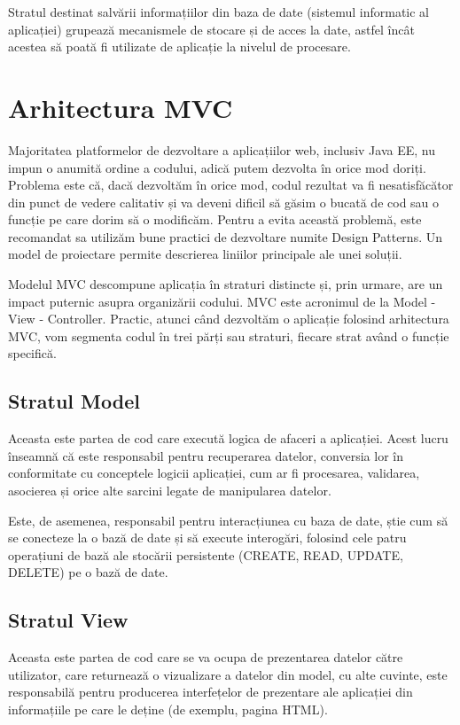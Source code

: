 Stratul destinat salvării informațiilor din baza de date (sistemul informatic al aplicației) grupează mecanismele de stocare și de acces la date, astfel încât acestea să poată fi utilizate de aplicație la nivelul de procesare.\newline


\section{Arhitectura MVC}
Majoritatea platformelor de dezvoltare a aplicațiilor web, inclusiv Java EE, nu impun o anumită ordine a codului, adică putem dezvolta în orice mod doriți. Problema este că, dacă dezvoltăm în orice mod, codul rezultat va fi nesatisfăcător din punct de vedere calitativ și va deveni dificil să găsim o bucată de cod sau o funcție pe care dorim să o modificăm.\newline
Pentru a evita această problemă, este recomandat sa utilizăm bune practici de dezvoltare numite Design Patterns. Un model de proiectare permite descrierea liniilor principale ale unei soluții.\newline

Modelul MVC descompune aplicația în straturi distincte și, prin urmare, are un impact puternic asupra organizării codului. MVC este acronimul de la Model - View - Controller. Practic, atunci când dezvoltăm o aplicație folosind arhitectura MVC, vom segmenta codul în trei părți sau straturi, fiecare strat având o funcție specifică.

\subsection{Stratul Model}
Aceasta este partea de cod care execută logica de afaceri a aplicației. Acest lucru înseamnă că este responsabil pentru recuperarea datelor, conversia lor în conformitate cu conceptele logicii aplicației, cum ar fi procesarea, validarea, asocierea și orice alte sarcini legate de manipularea datelor.\newline

Este, de asemenea, responsabil pentru interacțiunea cu baza de date, știe cum să se conecteze la o bază de date și să execute interogări, folosind cele patru operațiuni de bază ale stocării persistente (CREATE, READ, UPDATE, DELETE) pe o bază de date.

\subsection{Stratul View}
Aceasta este partea de cod care se va ocupa de prezentarea datelor către utilizator, care returnează o vizualizare a datelor din model, cu alte cuvinte, este responsabilă pentru producerea interfețelor de prezentare ale aplicației din informațiile pe care le deține (de exemplu, pagina HTML).\newline

